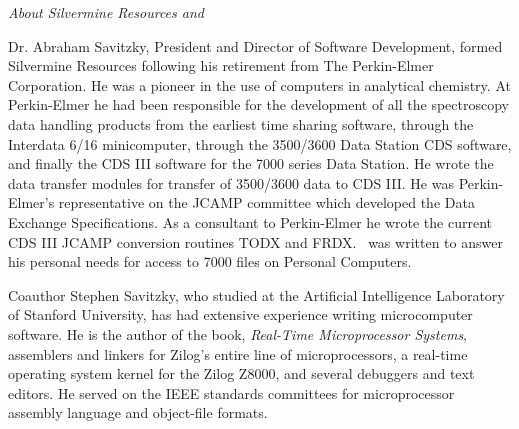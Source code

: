  
\newpage



\begin{center}
{\sl About Silvermine Resources and \RD}
\end{center}

Dr. Abraham Savitzky, President and Director of Software Development,
formed Silvermine Resources following his retirement from The
Perkin-Elmer Corporation.  He was a pioneer in the use of computers in
analytical chemistry.\cite{as1,as2} At Perkin-Elmer he had been
responsible for the development of all the spectroscopy data handling
products from the earliest time sharing software, through the
Interdata 6/16 minicomputer, through the 3500/3600 Data Station CDS
software, and finally the CDS III software for the 7000 series Data
Station.  He wrote the data transfer modules for transfer of 3500/3600
data to CDS III.  He was Perkin-Elmer's representative on the JCAMP
committee which developed the Data Exchange
Specifications.\cite{JCAMP} As a consultant to Perkin-Elmer he wrote
the current CDS III JCAMP conversion routines TODX and FRDX.  \RD\ was
written to answer his personal needs for access to 7000 files on
Personal Computers.

Coauthor Stephen Savitzky, who studied at the Artificial Intelligence
Laboratory of Stanford University, has had extensive experience
writing microcomputer software.  He is the author of the book, {\em
Real-Time Microprocessor Systems},\cite{ss1} assemblers and linkers
for Zilog's entire line of microprocessors, a real-time operating
system kernel for the Zilog Z8000, and several debuggers and text
editors.  He served on the IEEE standards committees for
microprocessor assembly language\cite{IEEE-694} and object-file
formats.\cite{IEEE-695}

\def\thebibliography#1{\medskip
\noindent\ \hrulefill\ 
\medskip\list
 {[\arabic{enumi}]}{\settowidth\labelwidth{[#1]}\leftmargin\labelwidth
 \advance\leftmargin\labelsep
 \usecounter{enumi}}
 \def\newblock{\hskip .11em plus .33em minus .07em}
 \sloppy\clubpenalty4000\widowpenalty4000
 \sfcode`\.=1000\relax}

